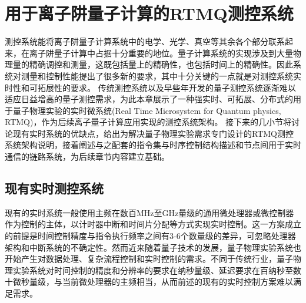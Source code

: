 
\chapter[用于离子阱量子计算的RTMQ测控系统]{用于离子阱量子计算的RTMQ测控系统\label{section:fpga_rtmq}}


测控系统能将离子阱量子计算系统中的电学、光学、真空等其余各个部分联系起来，在离子阱量子计算中占据十分重要的地位。量子计算系统的实现涉及到大量物理量的精确调控和测量，这既包括量上的精确性，也包括时间上的精确性。因此系统对测量和控制性能提出了很多新的要求，其中十分关键的一点就是对测控系统实时性和可拓展性的要求。
传统测控系统以及早些年开发的量子测控系统逐渐难以适应日益增高的量子测控需求，为此本章展示了一种强实时、可拓展、分布式的用于量子物理实验的实时微系统(Real Time Microsystem for Quantum physics, RTMQ)，作为后续离子量子计算应用实现的测控系统架构。
接下来的几小节将讨论现有实时系统的优缺点，给出为解决量子物理实验需求专门设计的RTMQ测控系统架构说明，接着阐述与之配套的指令集与时序控制结构描述和节点间用于实时通信的链路系统，为后续章节内容建立基础。

\section[现有实时测控系统]{现有实时测控系统}


现有的实时系统一般使用主频在数百MHz至GHz量级的通用微处理器或微控制器作为控制的主体，以计时器中断和时间片分配等方式实现实时控制。这一方案成立的前提是时间控制精度与指令执行频率之间有3-6个数量级的差异，可忽略处理器架构和中断系统的不确定性。然而近来随着量子技术的发展，量子物理实验系统也开始产生对数据处理、复杂流程控制和实时控制的需求。不同于传统行业，量子物理实验系统对时间控制的精度和分辨率的要求在纳秒量级、延迟要求在百纳秒至数十微秒量级\cite[]{junhua03}，与当前微处理器的主频相当，从而前述的现有的实时控制方案难以满足需求。

